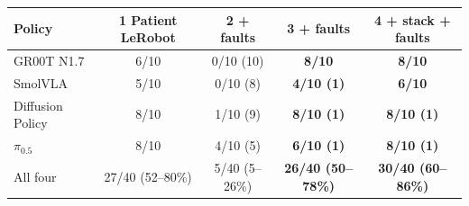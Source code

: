 \begin{tabular}{l cccc}
\toprule
Policy & 1 Patient LeRobot & 2 + faults & 3 \drtc{} + faults & 4 \drtc{} + stack + faults \\
\midrule
GR00T N1.7 & 6/10 & 0/10 (10) & \textbf{8/10} & \textbf{8/10} \\
SmolVLA & 5/10 & 0/10 (8) & \textbf{4/10 (1)} & \textbf{6/10} \\
Diffusion Policy & 8/10 & 1/10 (9) & \textbf{8/10 (1)} & \textbf{8/10 (1)} \\
$\pi_{0.5}$ & 8/10 & 4/10 (5) & \textbf{6/10 (1)} & \textbf{8/10 (1)} \\
\midrule
All four & 27/40 (52--80\%) & 5/40 (5--26\%) & \textbf{26/40 (50--78\%)} & \textbf{30/40 (60--86\%)} \\
\bottomrule
\end{tabular}
